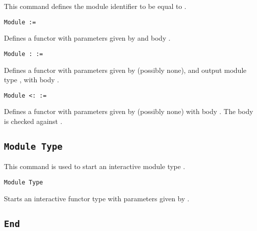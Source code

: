 This command defines the module identifier {\ident} to be equal to
{\modexpr}. 

\begin{Variants}
\item{\tt Module {\ident} {\modbindings} := {\modexpr}}

 Defines a functor with parameters given by {\modbindings} and body {\modexpr}.

%
%

\item{\tt Module {\ident} {\modbindings} \verb.:. {\modtype} :=
    {\modexpr}}

  Defines a functor with parameters given by {\modbindings} (possibly none),
  and output module type {\modtype}, with body {\modexpr}. 

\item{\tt Module {\ident} {\modbindings} \verb.<:. {\modtype} :=
    {\modexpr}}

  Defines a functor with parameters given by {\modbindings} (possibly none) 
  with body {\modexpr}. The body is checked against {\modtype}.

\end{Variants}

\subsection{\tt Module Type {\ident}
}

This command is used to start an interactive module type {\ident}.

\begin{Variants}

\item{\tt Module Type {\ident} {\modbindings}}

  Starts an interactive functor type with parameters given by {\modbindings}.

\end{Variants}

\subsection{\tt End {\ident}
}

